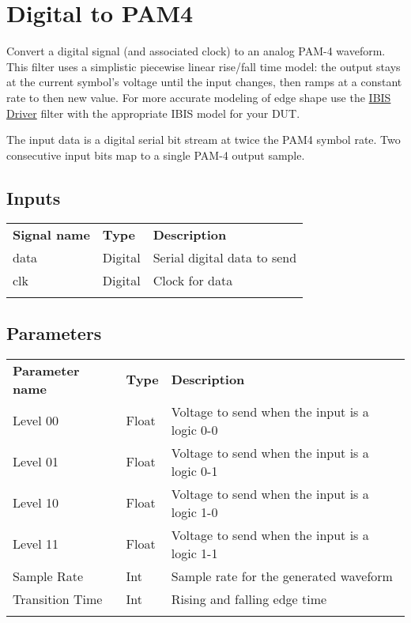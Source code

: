 \section{Digital to PAM4}
\label{filter:digitaltopam4}

Convert a digital signal (and associated clock) to an analog PAM-4 waveform. This filter uses a simplistic piecewise
linear rise/fall time model: the output stays at the current symbol's voltage until the input changes, then ramps at a
constant rate to then new value. For more accurate modeling of edge shape use the \hyperref[filter:ibisdriver]{IBIS
Driver} filter with the appropriate IBIS model for your DUT.

The input data is a digital serial bit stream at twice the PAM4 symbol rate. Two consecutive input bits map to a single
PAM-4 output sample.

\subsection{Inputs}

\begin{tabularx}{16cm}{llX}
\thickhline
\textbf{Signal name} & \textbf{Type} & \textbf{Description} \\
\thickhline
data & Digital & Serial digital data to send\\
\thinhline
clk & Digital & Clock for data\\
\thickhline
\end{tabularx}

\subsection{Parameters}

\begin{tabularx}{16cm}{llX}
\thickhline
\textbf{Parameter name} & \textbf{Type} & \textbf{Description} \\
\thickhline
Level 00 & Float & Voltage to send when the input is a logic 0-0\\
\thinhline
Level 01 & Float & Voltage to send when the input is a logic 0-1\\
\thinhline
Level 10 & Float & Voltage to send when the input is a logic 1-0\\
\thinhline
Level 11 & Float & Voltage to send when the input is a logic 1-1\\
\thinhline
Sample Rate & Int & Sample rate for the generated waveform\\
\thinhline
Transition Time & Int & Rising and falling edge time\\
\thickhline
\end{tabularx}

